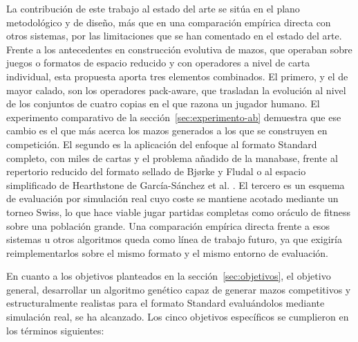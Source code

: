 La contribución de este trabajo al estado del arte se sitúa en el plano metodológico y de diseño, más que en una comparación empírica directa con otros sistemas, por las limitaciones que se han comentado en el estado del arte. Frente a los antecedentes en construcción evolutiva de mazos, que operaban sobre juegos o formatos de espacio reducido y con operadores a nivel de carta individual, esta propuesta aporta tres elementos combinados. El primero, y el de mayor calado, son los operadores pack-aware, que trasladan la evolución al nivel de los conjuntos de cuatro copias en el que razona un jugador humano. El experimento comparativo de la sección~\ref{sec:experimento-ab} demuestra que ese cambio es el que más acerca los mazos generados a los que se construyen en competición. El segundo es la aplicación del enfoque al formato Standard completo, con miles de cartas y el problema añadido de la manabase, frente al repertorio reducido del formato sellado de Bjørke y Fludal \cite{bjorke2017} o al espacio simplificado de Hearthstone de García-Sánchez et al. \cite{garciasanchez2016}. El tercero es un esquema de evaluación por simulación real cuyo coste se mantiene acotado mediante un torneo Swiss, lo que hace viable jugar partidas completas como oráculo de fitness sobre una población grande. Una comparación empírica directa frente a esos sistemas u otros algoritmos queda como línea de trabajo futuro, ya que exigiría reimplementarlos sobre el mismo formato y el mismo entorno de evaluación.

En cuanto a los objetivos planteados en la sección~\ref{sec:objetivos}, el objetivo general, desarrollar un algoritmo genético capaz de generar mazos competitivos y estructuralmente realistas para el formato Standard evaluándolos mediante simulación real, se ha alcanzado. Los cinco objetivos específicos se cumplieron en los términos siguientes:

